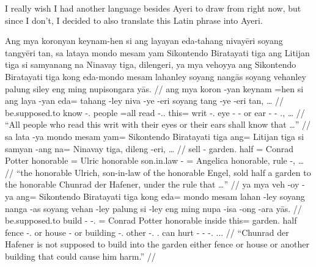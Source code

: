 \documentclass[12pt,paper=a4]{scrartcl}
\begin{document}
I really wish I had another language besides Ayeri to draw from right now, but 
since I don't, I decided to also translate this Latin phrase into Ayeri.


\pex
	\glpreamble Ang mya koronyan keynam-hen si ang layayan eda-tahang 
		nivayēri soyang tangyēri tan, sa lataya mondo mesam yam 
		Sikontendo Biratayati tiga ang Litijan tiga si samyanang na 
		Ninavay tiga, dilengeri, ya mya vehoyya ang Sikontendo 
		Biratayati tiga kong eda-mondo mesam lahanley soyang nangās 
		soyang vehanley palung siley eng ming nupisongara yās. //
	\a \begingl
		\gla ang mya koron -yan keynam =hen si ang laya -yan eda= tahang 
			-ley niva -ye -eri soyang tang -ye -eri tan, … //
		\glb \AgtT{} be.supposed.to know -\Tpl{}.\M{} people =all \Rel{} 
			\AgtT{} read -\Tpl{}.\M{}.\Top{} this= writ 
			-\Parg{}.\Inan{} eye -\Pl{} -\Ins{} or ear -\Pl{} 
			-\Ins{} \Tpl{}.\Gen{}, … //
		\glft \enquote{All people who read this writ with their eyes or 
			their ears shall know that …} //
	\endgl
	\a \begingl
		\gla sa lata -ya mondo mesam yam= Sikontendo Biratayati tiga 
			ang= Litijan tiga si samyan -ang na= Ninavay tiga, 
			dileng -eri, … //
		\glb \PatT{} sell -\Tsg{} garden.\Top{} half \Dat{}= Conrad 
			Potter honorable \Aarg{}= Ulric honorable \Rel{} 
			son.in.law -\Aarg{} \Gen{}= Angelica honorable, rule 
			-\Ins{}, … //
		\glft \enquote{the honorable Ulrich, son-in-law of the honorable 
			Engel, sold half a garden to the honorable Chunrad der 
			Hafener, under the rule that …} //
	\endgl
	\a \begingl
		\gla ya mya veh -oy -ya ang= Sikontendo Biratayati tiga kong 
			eda= mondo mesam lahan -ley soyang nanga -as soyang 
			vehan -ley palung si -ley eng ming nupa -isa -ong -ara 
			yās. //
		\glb \LocT{} be.supposed.to build -\Neg{} -\Tsg{}.\M{} \Aarg{}= 
			Conrad Potter honorable inside this= garden.\Top{} half 
			fence -\Parg{}.\Inan{} or house -\Parg{} or building 
			-\Parg{}.\Inan{} other \Rel{} -\Parg{}.\Inan{} 
			\Aarg{}.\Inan{} can hurt -\Caus{} -\Irr{} 
			-\Tsg{}.\Inan{} \Tsg{}.\M{}.\Parg{}. //
		\glft \enquote{Chunrad der Hafener is not supposed to build into 
		the garden either fence or house or another building that could 
		cause him harm.} //
	\endgl
\xe
\end{document}
